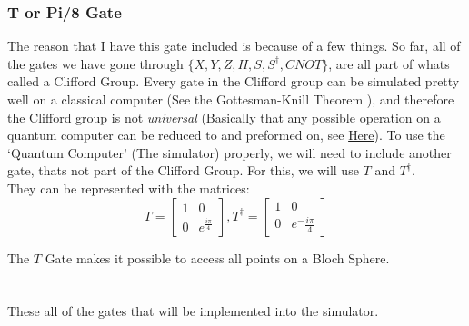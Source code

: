 \documentclass[../main.tex]{subfiles}
\begin{document}
\subsubsection{T or Pi/8 Gate}

The reason that I have this gate included is because of a few things. So
far, all of the gates we have gone through
\(\{ X,Y,Z,H,S,S^\dagger, CNOT \}\), are all part of whats called a
Clifford Group. Every gate in the Clifford group can be simulated pretty
well on a classical computer (See the Gottesman-Knill Theorem \cite{gottesmanknill}),
and therefore the Clifford group is not \emph{universal} (Basically that
any possible operation on a quantum computer can be reduced to and
preformed on, see
\href{https://en.wikipedia.org/wiki/Quantum_gate\#Universal_quantum_gates}{Here}).
To use the `Quantum Computer' (The simulator) properly, we will need to
include another gate, thats not part of the Clifford Group. For this, we
will use \(T\) and \(T^\dagger\).\\
They can be represented with the matrices:\\
\begin{equation}
	T = \left[ \begin{matrix} 1 & 0\\0 & e^\frac{i\pi}{4}\end{matrix} \right], T^\dagger = \left[ \begin{matrix} 1 & 0\\0 & e^-\frac{i\pi}{4}\end{matrix} \right]
\end{equation}

The \(T\) Gate makes it possible to access all points on a Bloch
Sphere.\\ \\ \\
These all of the gates that will be implemented into the simulator.
\end{document}
